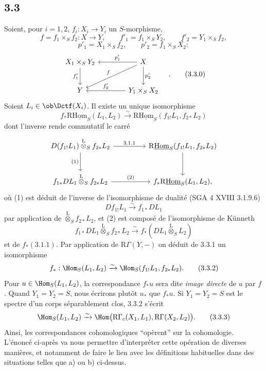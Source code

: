 \subsection*{3.3}
Soient, pour $i=1,2$, $f_i:X_i\to Y_i$ un $S$-morphisme,
\[
f=f_1\times_S f_2:X\to Y,
\qquad
f'_1=f_1\times_S Y_2,
\qquad
f'_2=Y_1\times_S f_2,
\]
\[
p'_1=X_1\times_S f_2,
\qquad
p'_2=f_1\times_S X_2:
\]
\begin{equation}
\begin{tikzcd}[column sep=3.8em,row sep=2.4em]
X_1\times_S Y_2 \arrow[d,"f'_1"'] & X \arrow[l,"p'_1"'] \arrow[dl,"f"'] \arrow[d,"p'_2"] \\
Y & Y_1\times_S X_2 \arrow[l,"f'_2"']
\end{tikzcd}\quad .
\tag{3.3.0}
\end{equation}
Soient $L_i\in\ob\Dctf(X_i)$. Il existe un unique isomorphisme
\begin{equation}
f_*\mathrm{R}\underline{\mathrm{Hom}}_S(L_1,L_2)
\xrightarrow{\sim}
\mathrm{R}\underline{\mathrm{Hom}}_S(f_{1!}L_1,f_{2*}L_2)
\tag{3.3.1}
\end{equation}
dont l'inverse rende commutatif le carré
\[
\begin{tikzcd}[column sep=4.5em,row sep=2.6em]
D(f_{1!}L_1)\overset{\mathrm{L}}{\otimes}_S f_{2*}L_2
  \arrow[r,"3.1.1"] \arrow[d,"(1)"']
& \mathrm{R}\underline{\mathrm{Hom}}_S(f_{1!}L_1,f_{2*}L_2) \arrow[d] \\
f_{1*}DL_1\overset{\mathrm{L}}{\otimes}_S f_{2*}L_2
  \arrow[r,"(2)"]
& f_*\mathrm{R}\underline{\mathrm{Hom}}_S(L_1,L_2),
\end{tikzcd}
\]
où (1) est
déduit de l'inverse de l'isomorphisme de dualité (SGA 4 XVIII 3.1.9.6)
\[
Df_{1!}L_1\xrightarrow{\sim}f_{1*}DL_1
\]
par application de $\overset{\mathrm{L}}{\otimes}_S f_{2*}L_2$, et (2) est composé de l'isomorphisme de Künneth
\[
f_{1*}DL_1\overset{\mathrm{L}}{\otimes}_S f_{2*}L_2
\xrightarrow{\sim}
f_*(DL_1\overset{\mathrm{L}}{\otimes}_S L_2)
\]
et de $f_*(3.1.1)$. Par application de $\mathrm{R}\Gamma(Y,-)$ on déduit de 3.3.1 un isomorphisme
\begin{equation}
f_*:\Hom_S(L_1,L_2)
\xrightarrow{\sim}
\Hom_S(f_{1!}L_1,f_{2*}L_2).
\tag{3.3.2}
\end{equation}
Pour $u\in\Hom_S(L_1,L_2)$, la correspondance $f_*u$ sera dite \emph{image directe} de $u$ par $f$. Quand $Y_1=Y_2=S$, nous écrirons plutôt $u_*$ que $f_*u$. Si $Y_1=Y_2=S$ est le spectre d'un corps séparablement clos, 3.3.2 s'écrit
\begin{equation}
\Hom_S(L_1,L_2)
\xrightarrow{\sim}
\Hom\bigl(\mathrm{R}\Gamma_c(X_1,L_1),\mathrm{R}\Gamma(X_2,L_2)\bigr).
\tag{3.3.3}
\end{equation}
Ainsi, les correspondances cohomologiques ``opèrent'' sur la cohomologie. L'énoncé ci-après va nous permettre d'interpréter cette opération de diverses manières, et notamment de faire le lien avec les définitions habituelles dans des situations telles que a) ou b) ci-dessus.

